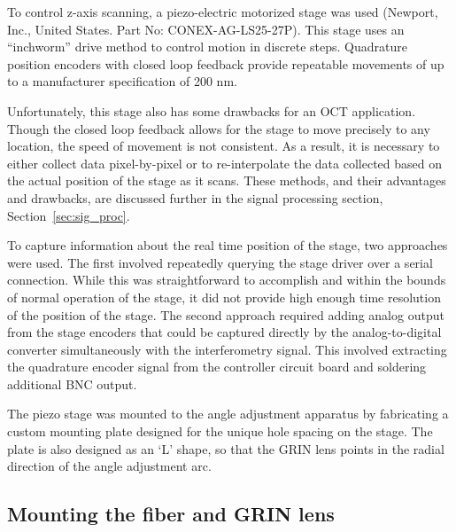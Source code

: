 To control z-axis scanning, a piezo-electric motorized stage was used (Newport, Inc., United States. Part No: CONEX-AG-LS25-27P). This stage uses an ``inchworm'' drive method to control motion in discrete steps. Quadrature position encoders with closed loop feedback provide repeatable movements of up to a manufacturer specification of 200 nm.

Unfortunately, this stage also has some drawbacks for an OCT application. Though the closed loop feedback allows for the stage to move precisely to any location, the speed of movement is not consistent. As a result, it is necessary to either collect data pixel-by-pixel or to re-interpolate the data collected based on the actual position of the stage as it scans. These methods, and their advantages and drawbacks, are discussed further in the signal processing section, Section~\ref{sec:sig_proc}.

To capture information about the real time position of the stage, two approaches were used. The first involved repeatedly querying the stage driver over a serial connection. While this was straightforward to accomplish and within the bounds of normal operation of the stage, it did not provide high enough time resolution of the position of the stage. The second approach required adding analog output from the stage encoders that could be captured directly by the analog-to-digital converter simultaneously with the interferometry signal. This involved extracting the quadrature encoder signal from the controller circuit board and soldering additional BNC output.

The piezo stage was mounted to the angle adjustment apparatus by fabricating a custom mounting plate designed for the unique hole spacing on the stage. The plate is also designed as an `L' shape, so that the GRIN lens points in the radial direction of the angle adjustment arc.


\subsection{Mounting the fiber and GRIN lens}

